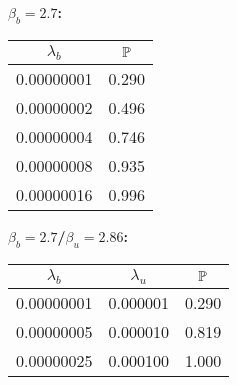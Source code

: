 \vspace{1cm}
\begin{minipage}{.45\textwidth}
	{\bf \(\beta_b=2.7\):}
	\begin{tabular}{|c|c|}
	\(\lambda_b\) & \(\P\) \\ \hline
	0.00000001 & 0.290 \\ \hline
	0.00000002 & 0.496 \\ \hline
	0.00000004 & 0.746 \\ \hline
	0.00000008 & 0.935 \\ \hline
	0.00000016 & 0.996 \\ \hline
	\end{tabular}
\end{minipage}
\begin{minipage}{.3\textwidth}
	{\bf \(\beta_b=2.7\)/\(\beta_u=2.86\):}
	\begin{tabular}{|c|c|c|}
	\(\lambda_b\) & \(\lambda_u\) & \(\P\) \\ \hline
	0.00000001 & 0.000001 & 0.290 \\ \hline
	0.00000005 & 0.000010 & 0.819 \\ \hline
	0.00000025 & 0.000100 & 1.000 \\ \hline
	\end{tabular}
\end{minipage}

